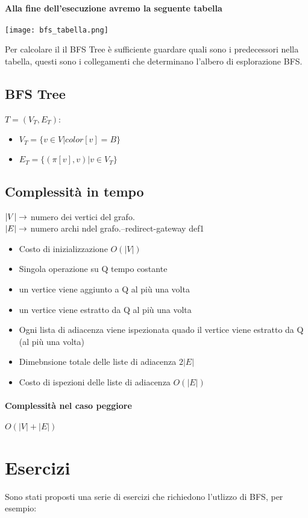 \paragraph*{Alla fine dell'esecuzione avremo la seguente tabella}
\begin{center}
    \texttt{[image: bfs\_tabella.png]}
\end{center}
Per calcolare il il BFS Tree è sufficiente guardare quali sono i predecessori nella tabella,
questi sono i collegamenti che determinano l'albero di esplorazione BFS.
\subsection{BFS Tree}
$T = (V_T, E_T)$:
\begin{itemize}
    \item $V_T = \{v \in V | color[v] = B\}$
    \item $E_T = \{(\pi[v], v) | v \in V_T\}$
\end{itemize}
\subsection{Complessità in tempo}
$|V| \rightarrow$ numero dei vertici del grafo.\\
$|E| \rightarrow$ numero archi ndel grafo.--redirect-gateway def1
\begin{itemize}
    \item Costo di inizializzazione \ra $O(|V|)$
    \item Singola operazione su Q \ra tempo costante
    \item un vertice viene aggiunto a Q al più una volta
    \item un vertice viene estratto da Q al più una volta
    \item Ogni lista di adiacenza viene ispezionata quado il vertice viene estratto da Q
    (al più una volta)
    \item Dimebnsione totale delle liste di adiacenza \ra $2|E|$
    \item Costo di ispezioni delle liste di adiacenza \ra $O(|E|)$
\end{itemize}
\paragraph*{Complessità nel caso peggiore} $O(|V|+|E|)$
\section{Esercizi}
Sono stati proposti una serie di esercizi che richiedono l'utlizzo di BFS, per
esempio:
